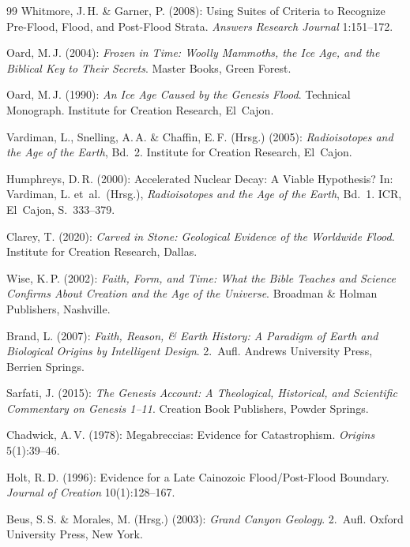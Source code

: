 ﻿\documentclass[12pt,a4paper]{report}
\begin{document}
\begin{thebibliography}{99}
Whitmore, J.\,H. \& Garner, P. (2008): Using Suites of Criteria to Recognize Pre-Flood, Flood, and Post-Flood Strata. \textit{Answers Research Journal} 1:151--172.

Oard, M.\,J. (2004): \textit{Frozen in Time: Woolly Mammoths, the Ice Age, and the Biblical Key to Their Secrets}. Master Books, Green Forest.

Oard, M.\,J. (1990): \textit{An Ice Age Caused by the Genesis Flood}. Technical Monograph. Institute for Creation Research, El~Cajon.

Vardiman, L., Snelling, A.\,A. \& Chaffin, E.\,F. (Hrsg.) (2005): \textit{Radioisotopes and the Age of the Earth}, Bd.\ 2. Institute for Creation Research, El~Cajon.

Humphreys, D.\,R. (2000): Accelerated Nuclear Decay: A Viable Hypothesis? In: Vardiman, L. et\ al.\ (Hrsg.), \textit{Radioisotopes and the Age of the Earth}, Bd.\ 1. ICR, El~Cajon, S.\ 333--379.

Clarey, T. (2020): \textit{Carved in Stone: Geological Evidence of the Worldwide Flood}. Institute for Creation Research, Dallas.

Wise, K.\,P. (2002): \textit{Faith, Form, and Time: What the Bible Teaches and Science Confirms About Creation and the Age of the Universe}. Broadman \& Holman Publishers, Nashville.

Brand, L. (2007): \textit{Faith, Reason, \& Earth History: A Paradigm of Earth and Biological Origins by Intelligent Design}. 2.\ Aufl. Andrews University Press, Berrien Springs.

Sarfati, J. (2015): \textit{The Genesis Account: A Theological, Historical, and Scientific Commentary on Genesis 1--11}. Creation Book Publishers, Powder Springs.

Chadwick, A.\,V. (1978): Megabreccias: Evidence for Catastrophism. \textit{Origins} 5(1):39--46.

Holt, R.\,D. (1996): Evidence for a Late Cainozoic Flood/Post-Flood Boundary. \textit{Journal of Creation} 10(1):128--167.


Beus, S.\,S. \& Morales, M. (Hrsg.) (2003): \textit{Grand Canyon Geology}. 2.\ Aufl. Oxford University Press, New York.


\end{thebibliography}
\end{document}
